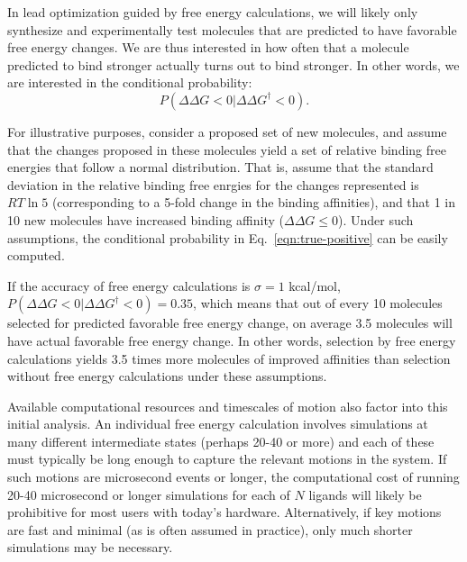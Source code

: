 \documentclass[9pt,bestpractices]{livecoms}
\begin{document}
In lead optimization guided by free energy calculations, we will likely only
synthesize and experimentally test molecules that are predicted to
have favorable free energy changes. We are thus interested in how
often that a molecule predicted to bind stronger actually turns out to
bind stronger. In other words, we are interested in the conditional
probability:
\begin{equation}
  P(\Delta\Delta G<0|\Delta\Delta G^\dagger<0).
  \label{eqn:true-positive}
\end{equation}

For illustrative purposes, consider a proposed set of new molecules, and assume that the changes proposed in these molecules yield a set of relative binding free energies that follow a normal
distribution. That is, assume that the standard deviation in the relative binding free enrgies for the changes represented is $RT\ln 5$
(corresponding to a 5-fold change in the binding affinities), and that
1 in 10 new molecules have increased binding affinity ($\Delta\Delta G
\leq 0$). Under such assumptions, the conditional probability in
Eq.~\ref{eqn:true-positive} can be easily computed. 

If the accuracy of free energy calculations is $\sigma = 1$ kcal/mol, $P(\Delta\Delta
G<0|\Delta\Delta G^\dagger<0) = 0.35$, which means that out of every
10 molecules selected for predicted favorable free energy change, on
average 3.5 molecules will have actual favorable free energy change.
In other words, selection by free energy calculations yields 3.5 times
more molecules of improved affinities than selection without free
energy calculations under these assumptions.
  
Available computational resources and timescales of motion also factor
into this initial analysis. An individual free energy calculation
involves simulations at many different intermediate states (perhaps
20-40 or more) and each of these must typically be long enough to
capture the relevant motions in the system. If such motions are
microsecond events or longer, the computational cost of running 20-40
microsecond or longer simulations for each of $N$ ligands will likely be
prohibitive for most users with today's hardware. Alternatively, if key motions are fast and minimal (as is often assumed in practice), only much shorter simulations may be necessary. 
\end{document}
